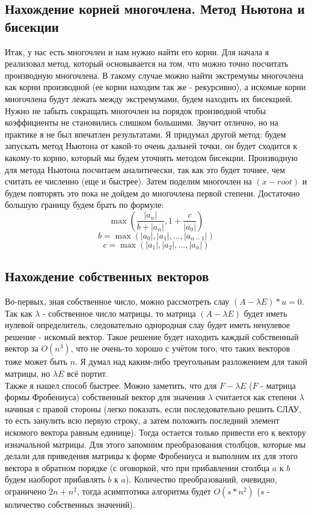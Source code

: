 \documentclass[a4paper,12pt,fleqn]{article}
\begin{document}
\subsection{Нахождение корней многочлена. Метод Ньютона и бисекции}
Итак, у нас есть многочлен и нам нужно найти его корни. Для начала я реализовал метод, который основывается на том, что можно точно посчитать производную многочлена. В такому случае можно найти экстремумы многочлена как корни производной (ее корни находим так же - рекурсивно), а искомые корни многочлена будут лежать между экстремумами, будем находить их бисекцией. Нужно не забыть сокращать многочлен на порядок производной чтобы коэффициенты не становились слишком большими. Звучит отлично, но на практике я не был впечатлен результатами. Я придумал другой метод: будем запускать метод Ньютона от какой-то очень дальней точки, он будет сходится к какому-то корню, который мы будем уточнять методом бисекции. Производную для метода Ньютона посчитаем аналитически, так как это будет точнее, чем считать ее численно (еще и быстрее). Затем поделим многочлен на $(x - root)$ и будем повторять это пока не дойдем до многочлена первой степени. Достаточно большую границу будем брать по формуле:
$$\max(\frac{|a_n|}{b + |a_n|}, 1 + \frac{c}{|a_0|})$$
$$b = \max(|a_0|, |a_1|, ..., |a_{n - 1}|)$$
$$c = \max(|a_1|, |a_2|, ..., |a_n|)$$

\subsection{Нахождение собственных векторов}
Во-первых, зная собственное число, можно рассмотреть слау $(A - \lambda E)*u = 0$. Так как $\lambda$ - собственное число матрицы, то матрица $(A - \lambda E)$ будет иметь нулевой определитель, следовательно однородная слау будет иметь ненулевое решение - искомый вектор. Такое решение будет находить каждый собственный вектор за $O(n^3)$, что не очень-то хорошо с учётом того, что таких векторов тоже может быть $n$. Я думал над каким-либо треугольным разложением для такой матрицы, но $\lambda E$ всё портит.\\
Также я нашел способ быстрее. Можно заметить, что для $F - \lambda E$ ($F$ - матрица формы Фробениуса) собственный вектор для значения $\lambda$ считается как степени $\lambda$ начиная с правой стороны (легко показать, если последовательно решить СЛАУ, то есть занулить всю первую строку, а затем положить последний элемент искомого вектора равным единице). Тогда остается только привести его к вектору изначальной матрицы. Для этого запомним преобразования столбцов, которые мы делали для приведения матрицы к форме Фробениуса и выполним их для этого вектора в обратном порядке (с оговоркой, что при прибавлении столбца $a$ к $b$ будем наоборот прибавлять $b$ к $a$). Количество преобразований, очевидно, ограничено $2n + n^2$, тогда асимптотика алгоритма будет $O(s * n^2)$ ($s$ - количество собственных значений).
\end{document}
